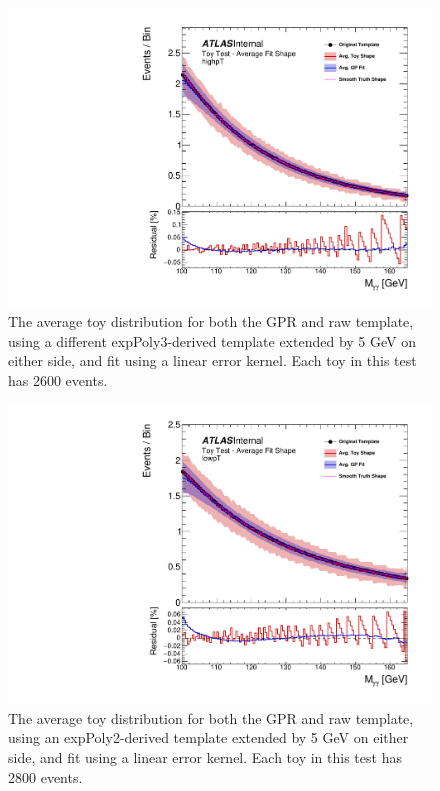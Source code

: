 \begin{figure} 
\begin{center}
  \includegraphics[width=\textwidth]{figures/background/gpr/validation/linear/ToyTest_AvgFitShape_highpT_2600_noSig}   
\caption{The average toy distribution for both the GPR and raw template, using a different expPoly3-derived template extended by 5 GeV on either side, and fit using a linear error kernel. Each toy in this test has 2600 events.}
\label{fig:linearkernel_highpt_2600_noSig}
\end{center}
\end{figure}

\begin{figure} 
\begin{center}
  \includegraphics[width=\textwidth]{figures/background/gpr/validation/linear/ToyTest_AvgFitShape_lowpT_2800_noSig}   
\caption{The average toy distribution for both the GPR and raw template, using an expPoly2-derived template extended by 5 GeV on either side, and fit using a linear error kernel. Each toy in this test has 2800 events.}
\label{fig:linearkernel_lowpt_2800_noSig}
\end{center}
\end{figure}

